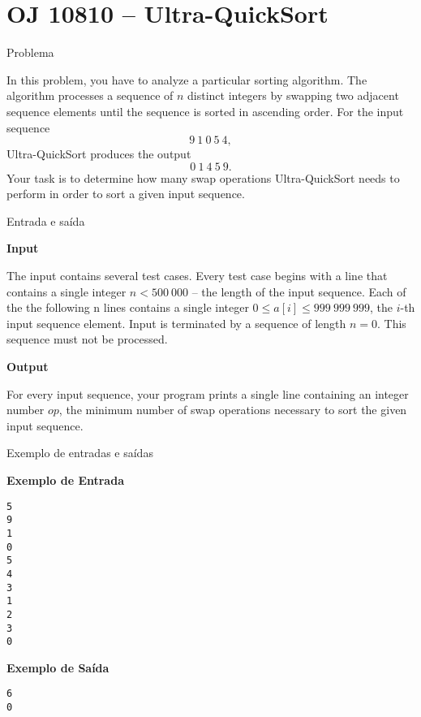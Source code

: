 \section{OJ 10810 -- Ultra-QuickSort}

\begin{frame}[fragile]{Problema}

In this problem, you have to analyze a particular sorting algorithm. The algorithm
processes a sequence of $n$ distinct integers by swapping two adjacent sequence elements until 
the sequence is sorted in ascending order. For the input sequence
\[
9\ 1\ 0\ 5\ 4,
\]
Ultra-QuickSort produces the output
\[
0\ 1\ 4\ 5\ 9.
\]
Your task is to determine how many swap operations Ultra-QuickSort needs to
perform in order to sort a given input sequence.

\end{frame}

\begin{frame}[fragile]{Entrada e saída}

\textbf{Input}

The input contains several test cases. Every test case begins with a line that
contains a single integer $n < 500\ 000$ -- the length of the input sequence. Each of
the the following n lines contains a single integer $0\leq a[i]\leq 999\ 999\ 999$, the $i$-th
input sequence element. Input is terminated by a sequence of length $n = 0$. This
sequence must not be processed.

\textbf{Output}

For every input sequence, your program prints a single line containing an integer
number $op$, the minimum number of swap operations necessary to sort the given
input sequence.

\end{frame}

\begin{frame}[fragile]{Exemplo de entradas e saídas}

\begin{minipage}[t]{0.5\textwidth}
\textbf{Exemplo de Entrada}
\begin{verbatim}
5
9
1
0
5
4
3
1
2
3
0
\end{verbatim}
\end{minipage}
\begin{minipage}[t]{0.45\textwidth}
\textbf{Exemplo de Saída}
\begin{verbatim}
6
0
\end{verbatim}
\end{minipage}
\end{frame}

